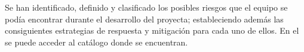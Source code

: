 Se han identificado, definido y clasificado los posibles riesgos que el equipo se podía encontrar durante el desarrollo del proyecta; estableciendo además las consiguientes estrategias de respuesta y mitigación para cada uno de ellos.
En el  se puede acceder al catálogo donde se encuentran.
